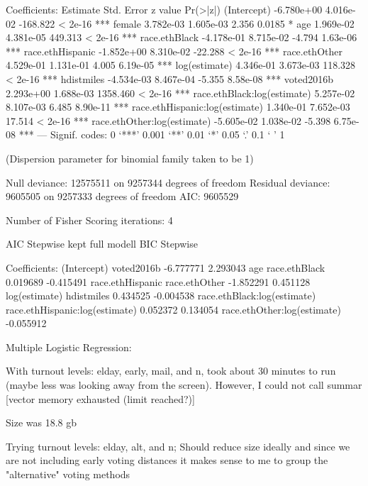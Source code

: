 Coefficients:
                                 Estimate Std. Error  z value Pr(>|z|)
(Intercept)                    -6.780e+00  4.016e-02 -168.822  < 2e-16 ***
female                          3.782e-03  1.605e-03    2.356   0.0185 *
age                             1.969e-02  4.381e-05  449.313  < 2e-16 ***
race.ethBlack                  -4.178e-01  8.715e-02   -4.794 1.63e-06 ***
race.ethHispanic               -1.852e+00  8.310e-02  -22.288  < 2e-16 ***
race.ethOther                   4.529e-01  1.131e-01    4.005 6.19e-05 ***
log(estimate)                   4.346e-01  3.673e-03  118.328  < 2e-16 ***
hdistmiles                     -4.534e-03  8.467e-04   -5.355 8.58e-08 ***
voted2016b                      2.293e+00  1.688e-03 1358.460  < 2e-16 ***
race.ethBlack:log(estimate)     5.257e-02  8.107e-03    6.485 8.90e-11 ***
race.ethHispanic:log(estimate)  1.340e-01  7.652e-03   17.514  < 2e-16 ***
race.ethOther:log(estimate)    -5.605e-02  1.038e-02   -5.398 6.75e-08 ***
---
Signif. codes:  0 ‘***’ 0.001 ‘**’ 0.01 ‘*’ 0.05 ‘.’ 0.1 ‘ ’ 1

(Dispersion parameter for binomial family taken to be 1)

    Null deviance: 12575511  on 9257344  degrees of freedom
Residual deviance:  9605505  on 9257333  degrees of freedom
AIC: 9605529

Number of Fisher Scoring iterations: 4

AIC Stepwise kept full modell
BIC Stepwise

Coefficients:
                   (Intercept)                      voted2016b
                     -6.777771                        2.293043
                           age                   race.ethBlack
                      0.019689                       -0.415491
              race.ethHispanic                   race.ethOther
                     -1.852291                        0.451128
                 log(estimate)                      hdistmiles
                      0.434525                       -0.004538
   race.ethBlack:log(estimate)  race.ethHispanic:log(estimate)
                      0.052372                        0.134054
   race.ethOther:log(estimate)
                     -0.055912  



Multiple Logistic Regression:

With turnout levels: elday, early, mail, and n,
took about 30 minutes to run (maybe less was looking away from the screen).
However, I could not call summar [vector memory exhausted (limit reached?)]

Size was 18.8 gb

Trying turnout levels: elday, alt, and n;
Should reduce size ideally and since we are not including early voting distances
it makes sense to me to group the "alternative" voting methods
